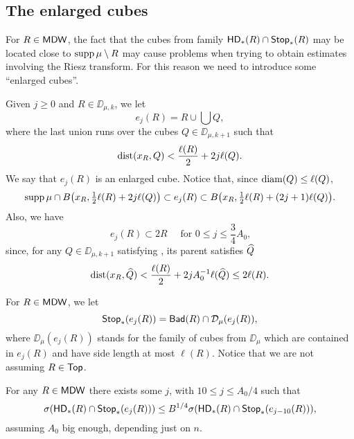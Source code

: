 \vv


\subsection{The enlarged cubes}\label{subsec:enlar}

For $R\in{\mathsf{MDW}}$, the fact that the cubes from family ${\mathsf{HD}}_*(R)\cap{\mathsf {Stop}}_*(R)$ may be located close to $\operatorname{supp}\mu\setminus R$ 
may cause problems when trying to obtain estimates involving the Riesz transform. For this reason we need to
introduce some ``enlarged cubes''.

Given $j\geq0$ and $R\in\DD_{\mu,k}$, 
we let 
$$e_j(R) = R \cup \bigcup Q,$$
where the last union runs over the cubes $Q\in\DD_{\mu,k+1}$ such that
\begin{equation}\label{eqxrq83}
{\rm dist}(x_R,Q)< \frac{\ell(R)}2 + 2j\ell(Q).
\end{equation}
We say that $e_j(R)$ is an enlarged cube.
Notice that, since ${\rm diam}(Q)\leq \ell(Q)$,
\begin{equation}\label{eqxrq84}
\operatorname{supp}\mu\cap B\big(x_R,\tfrac12\ell(R) + 2j\ell(Q)\big)\subset e_j(R) \subset B\big(x_R,\tfrac12\ell(R) + (2j+1)\ell(Q)\big).
\end{equation}
Also,  we have
\begin{equation}\label{eqqj8d}
e_j(R)\subset 2R\quad \mbox{ for $0\leq j\leq \frac34 A_0$,}
\end{equation}
since, for any $Q\in\DD_{\mu,k+1}$ satisfying , its parent satisfies ${\widehat{Q}}$
$${\rm dist}(x_R,{\widehat{Q}})< \frac{\ell(R)}2 + 2j A_0^{-1}\ell({\widehat{Q}}) \leq 2\ell(R).$$

For $R\in{\mathsf{MDW}}$, we let
$${\mathsf {Stop}}_*(e_j(R)) = {\mathsf{Bad}}(R) \cap{\mathcal D}_\mu(e_j(R)),$$
where $\DD_\mu(e_j(R))$ stands for the family of cubes from $\DD_\mu$ which are contained in
$e_j(R)$ and have side length at most $\ell(R)$. Notice that we are not assuming $R\in{\mathsf {Top}}$.



\vv
\begin{lemma}\label{lem:43}
For any $R\in{\mathsf{MDW}}$ there exists some $j$, with $10\leq j\leq A_0/4$ such that
\begin{equation}\label{eqsigmaj}
\sigma({\mathsf{HD}}_*(R)\cap{\mathsf {Stop}}_*(e_{j}(R))) \leq B^{1/4} \sigma({\mathsf{HD}}_*(R)\cap{\mathsf {Stop}}_*(e_{j-10}(R))),
\end{equation}
 assuming $A_0$ big enough, depending just on $n$. 
\end{lemma}

